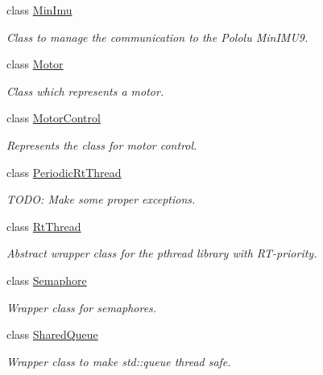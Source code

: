 \begin{DoxyCompactItemize}
class \hyperlink{class_u_s_u_1_1_min_imu}{\-Min\-Imu}
\begin{DoxyCompactList}\small\item\em \-Class to manage the communication to the \-Pololu \-Min\-I\-M\-U9. \end{DoxyCompactList}\item 
class \hyperlink{class_u_s_u_1_1_motor}{\-Motor}
\begin{DoxyCompactList}\small\item\em \-Class which represents a motor. \end{DoxyCompactList}\item 
class \hyperlink{class_u_s_u_1_1_motor_control}{\-Motor\-Control}
\begin{DoxyCompactList}\small\item\em \-Represents the class for motor control. \end{DoxyCompactList}\item 
class \hyperlink{class_u_s_u_1_1_periodic_rt_thread}{\-Periodic\-Rt\-Thread}
\begin{DoxyCompactList}\small\item\em \-T\-O\-D\-O\-: \-Make some proper exceptions. \end{DoxyCompactList}\item 
class \hyperlink{class_u_s_u_1_1_rt_thread}{\-Rt\-Thread}
\begin{DoxyCompactList}\small\item\em \-Abstract wrapper class for the pthread library with \-R\-T-\/priority. \end{DoxyCompactList}\item 
class \hyperlink{class_u_s_u_1_1_semaphore}{\-Semaphore}
\begin{DoxyCompactList}\small\item\em \-Wrapper class for semaphores. \end{DoxyCompactList}\item 
class \hyperlink{class_u_s_u_1_1_shared_queue}{\-Shared\-Queue}
\begin{DoxyCompactList}\small\item\em \-Wrapper class to make std\-::queue thread safe. \end{DoxyCompactList}\end{DoxyCompactItemize}
